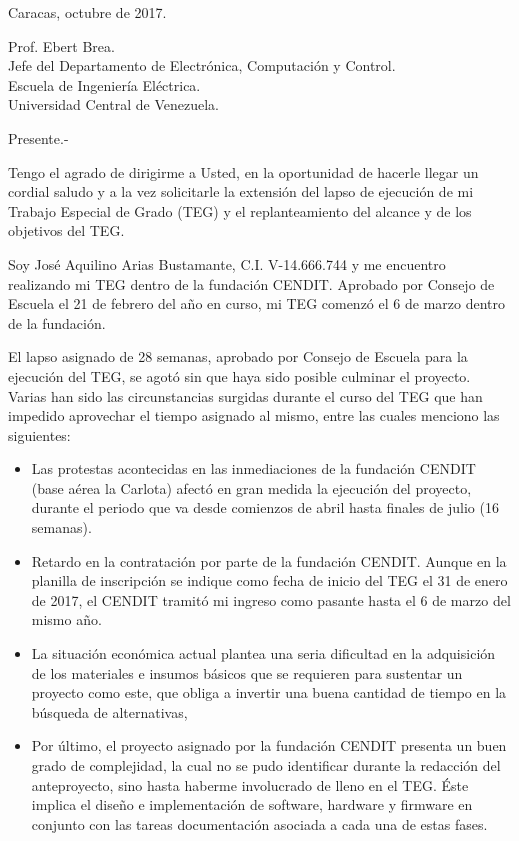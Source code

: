 \documentclass[paper=letter,oneside,fontsize=12pt, parskip=full]{article}
\begin{document}
	\begin{flushright}		
		\large
		Caracas, octubre de 2017. \\	
	\end{flushright}

	
	\begin{onehalfspace}
		\large
		Prof. Ebert Brea. \\
		Jefe del Departamento de Electrónica, Computación y Control. \\
		Escuela de Ingeniería Eléctrica. \\
		Universidad Central de Venezuela.	
	\end{onehalfspace}

	Presente.- 
	
	Tengo el agrado de dirigirme a Usted, en la oportunidad de hacerle llegar un cordial saludo y a la vez solicitarle la extensión del lapso de ejecución de mi Trabajo Especial de Grado (TEG) y el replanteamiento del alcance y de los objetivos del TEG.
	 
	Soy José Aquilino Arias Bustamante, C.I. V-14.666.744 y me encuentro realizando mi TEG dentro de la fundación CENDIT. Aprobado por Consejo de Escuela el 21 de febrero del año en curso, mi TEG comenzó el 6 de marzo dentro de la fundación.
	
	El lapso asignado de 28 semanas, aprobado por Consejo de Escuela para la ejecución del TEG, se agotó sin que haya sido posible culminar el proyecto. Varias han sido las circunstancias surgidas durante el curso del TEG que han impedido aprovechar el tiempo asignado al mismo, entre las cuales menciono las siguientes:
	
	\begin{itemize}
		\item Las protestas acontecidas en las inmediaciones de la fundación CENDIT (base aérea la Carlota) afectó en gran medida la ejecución del proyecto, durante el periodo que va desde comienzos de abril hasta finales de julio (16 semanas).
	
		\item Retardo en la contratación por parte de la fundación CENDIT. Aunque en la planilla de inscripción se indique como fecha de inicio del TEG el 31 de enero de 2017, el CENDIT tramitó mi ingreso como pasante hasta el 6 de marzo del mismo año. 
		
		\item La situación económica actual plantea una seria dificultad en la adquisición de los materiales e insumos básicos que se requieren para sustentar un proyecto como este, que obliga a invertir una buena cantidad de tiempo en la búsqueda de alternativas,
	
		\item Por último, el proyecto asignado por la fundación CENDIT presenta un buen grado de complejidad, la cual no se pudo identificar durante la redacción del anteproyecto, sino hasta haberme involucrado de lleno en el TEG. Éste implica el diseño e implementación de software, hardware y firmware en conjunto con las tareas documentación asociada a cada una de estas fases.
	\end{itemize}
	
\end{document}
